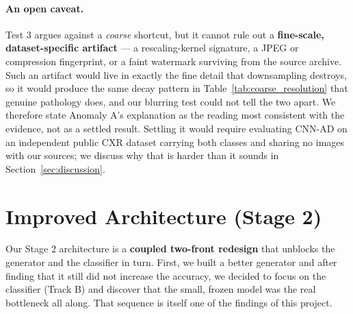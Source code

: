 \documentclass[11pt]{article}
\begin{document}
\paragraph{An open caveat.} Test 3 argues against a \emph{coarse} shortcut, but it cannot rule out a \textbf{fine-scale, dataset-specific artifact} --- a rescaling-kernel signature, a JPEG or compression fingerprint, or a faint watermark surviving from the source archive. Such an artifact would live in exactly the fine detail that downsampling destroys, so it would produce the same decay pattern in Table~\ref{tab:coarse_resolution} that genuine pathology does, and our blurring test could not tell the two apart. We therefore state Anomaly A's explanation as the reading most consistent with the evidence, not as a settled result. Settling it would require evaluating CNN-AD on an independent public CXR dataset carrying both classes and sharing no images with our sources; we discuss why that is harder than it sounds in Section~\ref{sec:discussion}.

\section{Improved Architecture (Stage 2)} \label{sec:improved_architecture}
Our Stage 2 architecture is a \textbf{coupled two-front redesign} that unblocks the generator and the classifier in turn. First, we built a better generator and after finding that it still did not increase the accuracy, we decided to focus on the classifier (Track B) and discover that the small, frozen model was the real bottleneck all along. That sequence is itself one of the findings of this project.
\end{document}
